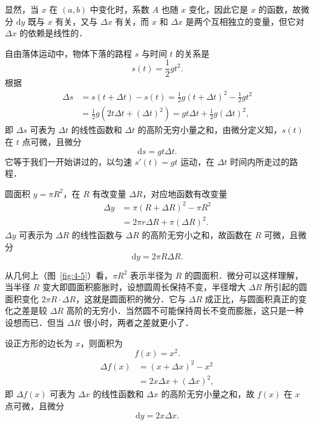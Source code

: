 显然，当 $x$ 在 $(a,b)$ 中变化时，系数 $A$ 也随 $x$ 变化，因此它是 $x$ 的函数，故微分 $\mathrm{d}y$ 既与 $x$ 有关，又与 $\Delta x$ 有关，而 $x$ 和 $\Delta x$ 是两个互相独立的变量，但它对 $\Delta x$ 的依赖是线性的．

\begin{example}\label{ex:4-2-1}
自由落体运动中，物体下落的路程 $s$ 与时间 $t$ 的关系是
\[
s(t)=\frac{1}{2}gt^{2}.
\]
根据
\[
\begin{aligned}
\Delta s&=s(t+\Delta t)-s(t)=\frac{1}{2}g(t+\Delta t)^{2}-\frac{1}{2}gt^{2}\\
&=\frac{1}{2}g\left(2t\Delta t+(\Delta t)^{2}\right)=gt\Delta t+\frac{1}{2}g(\Delta t)^{2},
\end{aligned}
\]
即 $\Delta s$ 可表为 $\Delta t$ 的线性函数和 $\Delta t$ 的高阶无穷小量之和，由微分定义知，$s(t)$ 在 $t$ 点可微，且微分
\[
\mathrm{d}s=gt\Delta t.
\]
它等于我们一开始讲过的，以匀速 $s'(t)=gt$ 运动，在 $\Delta t$ 时间内所走过的路程．
\end{example}

\begin{example}\label{ex:4-2-2}
圆面积 $y=\pi R^{2}$，在 $R$ 有改变量 $\Delta R$，对应地函数有改变量
\[
\begin{aligned}
\Delta y&=\pi(R+\Delta R)^{2}-\pi R^{2}\\
&=2\pi r\Delta R+\pi(\Delta R)^{2}.
\end{aligned}
\]
$\Delta y$ 可表示为 $\Delta R$ 的线性函数与 $\Delta R$ 的高阶无穷小之和，故函数在 $R$ 可微，且微分
\[
\mathrm{d}y=2\pi R\Delta R.
\]
\end{example}

从几何上（图~\ref{fig:4-5}）看，$\pi R^{2}$ 表示半径为 $R$ 的圆面积．微分可以这样理解，当半径 $R$ 变大即圆面积膨胀时，设想圆周长保持不变，半径增大 $\Delta R$ 所引起的圆面积变化 $2\pi R\cdot\Delta R$，这就是圆面积的微分．它与 $\Delta R$ 成正比，与圆面积真正的变化之差是较 $\Delta R$ 高阶的无穷小．当然圆不可能保持周长不变而膨胀，这只是一种设想而已．但当 $\Delta R$ 很小时，两者之差就更小了．

\begin{example}\label{ex:4-2-3}
设正方形的边长为 $x$，则面积为
\[
f(x)=x^{2}.
\]
\[
\begin{aligned}
\Delta f(x)&=(x+\Delta x)^{2}-x^{2}\\
&=2x\Delta x+(\Delta x)^{2},
\end{aligned}
\]
即 $\Delta f(x)$ 可表为 $\Delta x$ 的线性函数和 $\Delta x$ 的高阶无穷小量之和，故 $f(x)$ 在 $x$ 点可微，且微分
\[
\mathrm{d}y=2x\Delta x.
\]
\end{example}

